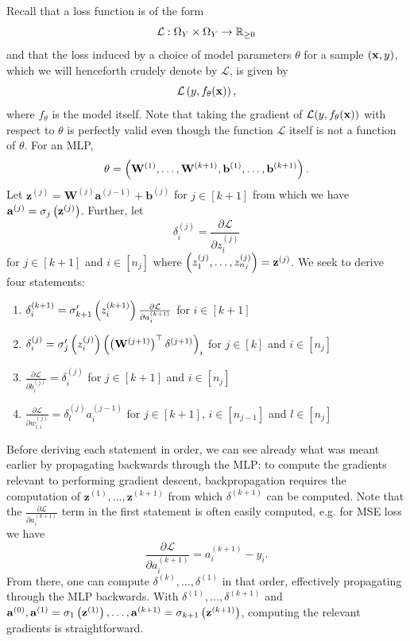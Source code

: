 \documentclass[11pt]{article}
\begin{document}
Recall that a loss function is of the form
$$
\mathcal{L}:\Omega_{Y}\times\Omega_{Y}\to\mathbb{R}_{\geq0}
$$
and that the loss induced by a choice of model parameters $\theta$ for a sample $(\mathbf{x},y)$, which we will henceforth crudely denote by $\mathcal{L}$, is given by
$$
\mathcal{L}\left(y,f_{\theta}(\mathbf{x})\right),
$$
where $f_{\theta}$ is the model itself. Note that taking the gradient of $\mathcal{L}(y,f_{\theta}(\mathbf{x}))$ with respect to $\theta$ is perfectly valid even though the function $\mathcal{L}$ itself is not a function of $\theta$. For an MLP,
$$
\theta
=
\left(\mathbf{W}^{(1)},\dots,\mathbf{W}^{(k+1)},\mathbf{b}^{(1)},\dots,\mathbf{b}^{(k+1)}\right).
$$
Let $\mathbf{z}^{(j)}=\mathbf{W}^{(j)}\mathbf{a}^{(j-1)}+\mathbf{b}^{(j)}$ for $j\in[k+1]$ from which we have $\mathbf{a}^{(j)}=\sigma_{j}\left(\mathbf{z}^{(j)}\right)$. Further, let
$$
\delta^{(j)}_i
=
\frac{\partial\mathcal{L}}{\partial z^{(j)}_i}
$$
for $j\in[k+1]$ and $i\in[n_j]$ where $\left(z_1^{(j)},\dots,z_{n_j}^{(j)}\right)=\mathbf{z}^{(j)}$. We seek to derive four statements:
\begin{enumerate}
    \item $\delta_i^{(k+1)}=\sigma_{k+1}'\left(z_i^{(k+1)}\right)\frac{\partial\mathcal{L}}{\partial a_i^{(k+1)}}$ for $i\in[k+1]$
    \item $\delta_i^{(j)}=\sigma_{j}'\left(z_i^{(j)}\right)\left(\left(\mathbf{W}^{(j+1)}\right)^\top\delta^{(j+1)}\right)_i$ for $j\in[k]$ and $i\in[n_j]$
    \item $\frac{\partial\mathcal{L}}{\partial b^{(j)}_i}=\delta^{(j)}_i$ for $j\in[k+1]$ and $i\in[n_j]$
    \item $\frac{\partial\mathcal{L}}{\partial w_{l,i}^{(j)}}=\delta_l^{(j)}a_i^{(j-1)}$ for $j\in[k+1]$, $i\in[n_{j-1}]$ and $l\in[n_j]$
\end{enumerate}
Before deriving each statement in order, we can see already what was meant earlier by propagating backwards through the MLP: to compute the gradients relevant to performing gradient descent, backpropagation requires the computation of $\mathbf{z}^{(1)},\dots,\mathbf{z}^{(k+1)}$ from which $\delta^{(k+1)}$ can be computed. Note that the $\frac{\partial\mathcal{L}}{\partial a_i^{(k+1)}}$ term in the first statement is often easily computed, e.g. for MSE loss we have
$$
\frac{\partial\mathcal{L}}{\partial a_i^{(k+1)}}
=
a_i^{(k+1)}-y_i.
$$
From there, one can compute $\delta^{(k)},\dots,\delta^{(1)}$ in that order, effectively propagating through the MLP backwards. With $\delta^{(1)},\dots,\delta^{(k+1)}$ and $\mathbf{a}^{(0)},\mathbf{a}^{(1)}=\sigma_1\left(\mathbf{z}^{(1)}\right),\dots,\mathbf{a}^{(k+1)}=\sigma_{k+1}\left(\mathbf{z}^{(k+1)}\right)$, computing the relevant gradients is straightforward.
\end{document}
